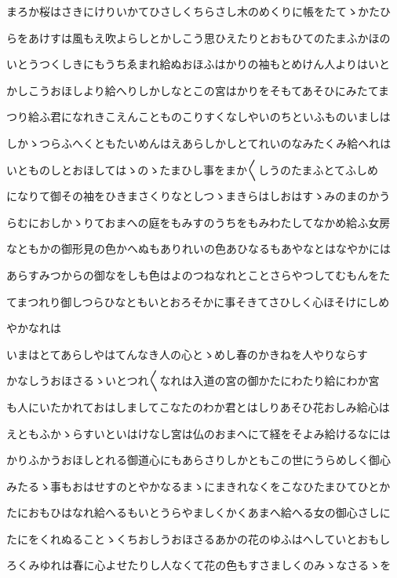 \documentclass[a4paper,11pt,landscape]{ltjtarticle}
\begin{document}
\par\medskip
まろか桜はさきにけりいかてひさしくちらさし木のめくりに帳をたてゝかたひ
\par\medskip
らをあけすは風もえ吹よらしとかしこう思ひえたりとおもひてのたまふかほの
\par\medskip
いとうつくしきにもうちゑまれ給ぬおほふはかりの袖もとめけん人よりはいと
\par\medskip
かしこうおほしより給へりしかしなとこの宮はかりをそもてあそひにみたてま
\par\medskip
つり給ふ君になれきこえんことものこりすくなしやいのちといふものいましは
\par\medskip
しかゝつらふへくともたいめんはえあらしかしとてれいのなみたくみ給へれは
\par\medskip
いとものしとおほしてはゝのゝたまひし事をまか〱しうのたまふとてふしめ
\par\medskip
になりて御その袖をひきまさくりなとしつゝまきらはしおはすゝみのまのかう
\par\medskip
らむにおしかゝりておまへの庭をもみすのうちをもみわたしてなかめ給ふ女房
\par\medskip
なともかの御形見の色かへぬもありれいの色あひなるもあやなとはなやかには
\par\medskip
あらすみつからの御なをしも色はよのつねなれとことさらやつしてむもんをた
\par\medskip
てまつれり御しつらひなともいとおろそかに事そきてさひしく心ほそけにしめ
\par\medskip
やかなれは
\par\medskip
いまはとてあらしやはてんなき人の心とゝめし春のかきねを人やりならす
\par\medskip
かなしうおほさるゝいとつれ〱なれは入道の宮の御かたにわたり給にわか宮
\par\medskip
も人にいたかれておはしましてこなたのわか君とはしりあそひ花おしみ給心は
\par\medskip
えともふかゝらすいといはけなし宮は仏のおまへにて経をそよみ給けるなには
\par\medskip
かりふかうおほしとれる御道心にもあらさりしかともこの世にうらめしく御心
\par\medskip
みたるゝ事もおはせすのとやかなるまゝにまきれなくをこなひたまひてひとか
\par\medskip
たにおもひはなれ給へるもいとうらやましくかくあまへ給へる女の御心さしに
\par\medskip
たにをくれぬることゝくちおしうおほさるあかの花のゆふはへしていとおもし
\par\medskip
ろくみゆれは春に心よせたりし人なくて花の色もすさましくのみゝなさるゝを
\end{document}
